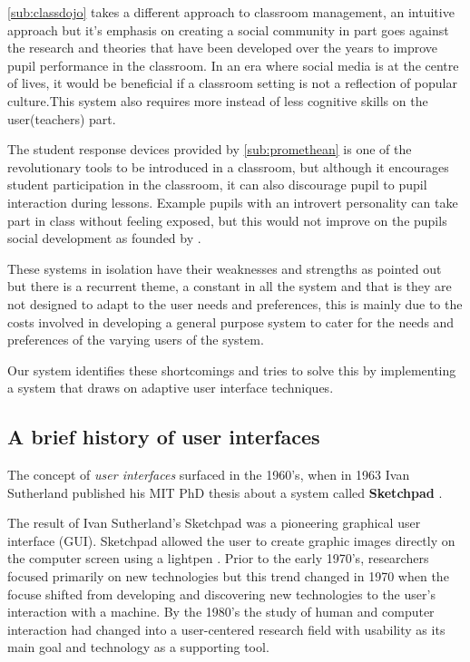 \ref{sub:classdojo} takes a different approach to classroom management, an intuitive approach but it's emphasis on creating a social community in part goes against the research and theories that have been developed over the years to improve pupil performance in the classroom. In an era where social media is at the centre of lives, it would be beneficial if a classroom setting is not a reflection of popular culture.This system also requires more instead of less cognitive skills on the user(teachers) part.

The student response devices provided by \ref{sub:promethean} is one of the revolutionary tools to be introduced in a classroom, but although it encourages student participation in the classroom, it can also discourage pupil to pupil interaction during lessons. Example pupils with an introvert personality can take part in class without feeling exposed, but this would not improve on the pupils social development as founded by \cite{alexander1992curriculum}.

These systems in isolation have their weaknesses and strengths as pointed out but there is a recurrent theme, a constant in all the system and that is they are not designed to adapt to the user needs and preferences, this is mainly due to the costs involved in developing a general purpose system to cater for the needs and preferences of the varying users of the system.

Our system identifies these shortcomings and tries to solve this by implementing a system that draws on adaptive user interface techniques.

\subsection{A brief history of user interfaces} \label{sub:history}

The concept of \emph{user interfaces} surfaced in the 1960's, when in 1963 Ivan Sutherland published his MIT PhD thesis about a system called \textbf{Sketchpad} \cite{sutherland1964sketch}.

The result of Ivan Sutherland's Sketchpad was a pioneering graphical user interface (GUI). Sketchpad allowed the user to create graphic images directly on the computer screen using a lightpen \cite{patrick2003intelligent}.
Prior to the early 1970's, researchers focused primarily on new technologies but this trend changed in 1970 when the focuse shifted from developing and discovering new technologies to the user's interaction with a machine.
By the 1980's the study of human and computer interaction had changed into a user-centered research field with usability as its main goal and technology as a supporting tool.\cite{patrick2003intelligent}


